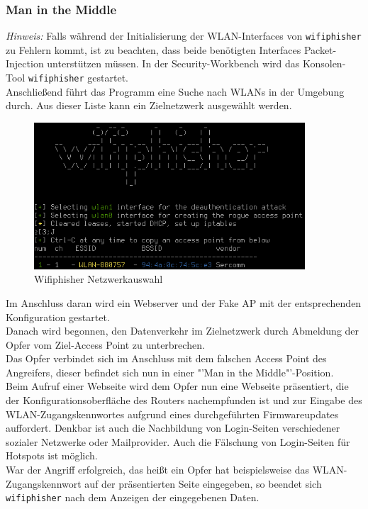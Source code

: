 \subsubsection{Man in the Middle}
\textit{Hinweis:} Falls während der Initialisierung der WLAN-Interfaces von \colorbox{altgray}{\lstinline|wifiphisher|} zu Fehlern kommt, ist zu beachten, dass beide benötigten Interfaces Packet-Injection unterstützen müssen. 
In der Security-Workbench wird das Konsolen-Tool \colorbox{altgray}{\lstinline|wifiphisher|} gestartet.\\
Anschließend führt das Programm eine Suche nach WLANs in der Umgebung durch. Aus dieser Liste kann ein  Zielnetzwerk ausgewählt werden. 
\begin{figure}[H]
	\centering
	\includegraphics[width=0.9\textwidth]{images/WLAN/wifiphisher.png}
	\caption{Wifiphisher Netzwerkauswahl}
\end{figure}
\noindent Im Anschluss daran wird ein Webserver und der Fake AP mit der entsprechenden Konfiguration gestartet. \\
Danach wird begonnen, den Datenverkehr im Zielnetzwerk durch Abmeldung der Opfer vom Ziel-Access Point zu unterbrechen. \\
Das Opfer verbindet sich im Anschluss mit dem falschen Access Point des Angreifers, dieser befindet sich nun in einer "'Man in the Middle"'-Position. \\
Beim Aufruf einer Webseite wird dem Opfer nun eine Webseite präsentiert, die der Konfigurationsoberfläche des Routers nachempfunden ist und zur Eingabe des WLAN-Zugangskennwortes aufgrund eines durchgeführten Firmwareupdates auffordert. Denkbar ist auch die Nachbildung von Login-Seiten verschiedener sozialer Netzwerke oder Mailprovider. Auch die Fälschung von Login-Seiten für Hotspots ist möglich. \\
War der Angriff erfolgreich, das heißt ein Opfer hat beispielsweise das WLAN-Zugangskennwort auf der präsentierten Seite eingegeben, so beendet sich \colorbox{altgray}{\lstinline|wifiphisher|} nach dem Anzeigen der eingegebenen Daten.

